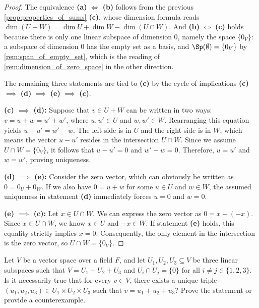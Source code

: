 \begin{proof}
The equivalence \textbf{(a)} $\iff$ \textbf{(b)} follows from the previous \cref{prop:properties_of_sums} \textbf{(c)}, whose dimension formula reads $\dim(U + W) = \dim U + \dim W - \dim(U \cap W)$. And \textbf{(b)} $\iff$ \textbf{(c)} holds because there is only one linear subspace of dimension $0$, namely the space $\{0_V\}$: a subspace of dimension $0$ has the empty set as a basis, and $\Sp(\emptyset) = \{0_V\}$ by \cref{rem:span_of_empty_set}, which is the reading of \cref{rem:dimension_of_zero_space} in the other direction.

The remaining three statements are tied to \textbf{(c)} by the cycle of implications \textbf{(c)} $\implies$ \textbf{(d)} $\implies$ \textbf{(e)} $\implies$ \textbf{(c)}.

\textbf{(c) $\implies$ (d):} Suppose that $v \in U + W$ can be written in two ways: $v = u + w = u' + w'$, where $u, u' \in U$ and $w, w' \in W$. Rearranging this equation yields $u - u' = w' - w$. The left side is in $U$ and the right side is in $W$, which means the vector $u - u'$ resides in the intersection $U \cap W$. Since we assume $U \cap W = \{0_V\}$, it follows that $u - u' = 0$ and $w' - w = 0$. Therefore, $u = u'$ and $w = w'$, proving uniqueness.

\textbf{(d) $\implies$ (e):} Consider the zero vector, which can obviously be written as $0 = 0_U + 0_W$. If we also have $0 = u + w$ for some $u \in U$ and $w \in W$, the assumed uniqueness in statement \textbf{(d)} immediately forces $u = 0$ and $w = 0$.

\textbf{(e) $\implies$ (c):} Let $x \in U \cap W$. We can express the zero vector as $0 = x + (-x)$. Since $x \in U \cap W$, we know $x \in U$ and $-x \in W$. If statement \textbf{(e)} holds, this equality strictly implies $x = 0$. Consequently, the only element in the intersection is the zero vector, so $U \cap W = \{0_V\}$.
\end{proof}

\begin{exercise}
\label{exc:pairwise_trivial_vs_direct_sum}
Let $V$ be a vector space over a field $F$, and let $U_1, U_2, U_3 \subseteq V$ be three linear subspaces such that $V = U_1 + U_2 + U_3$ and $U_i \cap U_j = \{0\}$ for all $i \ne j \in \{1, 2, 3\}$.
Is it necessarily true that for every $v \in V$, there exists a unique triple $(u_1, u_2, u_3) \in U_1 \times U_2 \times U_3$ such that $v = u_1 + u_2 + u_3$? Prove the statement or provide a counterexample.
\end{exercise}

